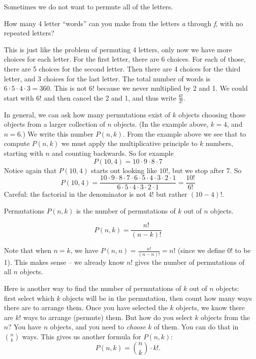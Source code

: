\documentclass[12pt]{article}
\begin{document}
Sometimes we do not want to permute all of the letters. 

\begin{example}
  How many 4 letter ``words'' can you make from the letters \textit{a} through \textit{f}, with no repeated letters?
  \begin{solution}
    This is just like the problem of permuting 4 letters, only now we have more choices for each letter.  For the first letter, there are 6 choices.  For each of those, there are 5 choices for the second letter.  Then there are 4 choices for the third letter, and 3 choices for the last letter.  The total number of words is $6\cdot 5\cdot 4 \cdot 3 = 360$.  This is not $6!$ because we never multiplied by 2 and 1.  We could start with $6!$ and then cancel the 2 and 1, and thus write $\frac{6!}{2!}$.
  \end{solution}
\end{example}

In general, we can ask how many permutations exist of $k$ objects choosing those objects from a larger collection of $n$ objects.  (In the example above, $k = 4$, and $n = 6$.)  We write this number $P(n,k)$.  From the example above we see that to compute $P(n,k)$ we must apply the multiplicative principle to $k$ numbers, starting with $n$ and counting backwards.  So for example
\[P(10, 4) = 10\cdot 9 \cdot 8 \cdot 7\]
Notice again that $P(10,4)$ starts out looking like $10!$, but we stop after 7.  So
\[P(10,4) = \frac{10\cdot 9 \cdot 8 \cdot 7 \cdot 6 \cdot 5 \cdot 4 \cdot 3 \cdot 2 \cdot 1}{6 \cdot 5 \cdot 4 \cdot 3 \cdot 2 \cdot 1} = \frac{10!}{6!}\]
Careful: the factorial in the denominator is not $4!$ but rather $(10-4)!$.  

\begin{defbox}{Permutations}
 $P(n,k)$ is the number of permutations of $k$ out of $n$ objects.
 
 \[P(n,k) = \frac{n!}{(n-k)!}\]
\end{defbox}

Note that when $n = k$, we have $P(n,n) = \frac{n!}{(n-n)!} = n!$ (since we define $0!$ to be 1).  This makes sense -- we already know $n!$ gives the number of permutations of all $n$ objects.

Here is another way to find the number of permutations of $k$ out of $n$ objects: first select which $k$ objects will be in the permutation, then count how many ways there are to arrange them.  Once you have selected the $k$ objects, we know there are $k!$ ways to arrange (permute) them.  But how do you select $k$ objects from the $n$?  You have $n$ objects, and you need to {\em choose} $k$ of them.  You can do that in ${n \choose k}$ ways.  This gives us another formula for $P(n,k)$:
\[P(n,k) = {n \choose k}\cdot k!.\]
\end{document}
